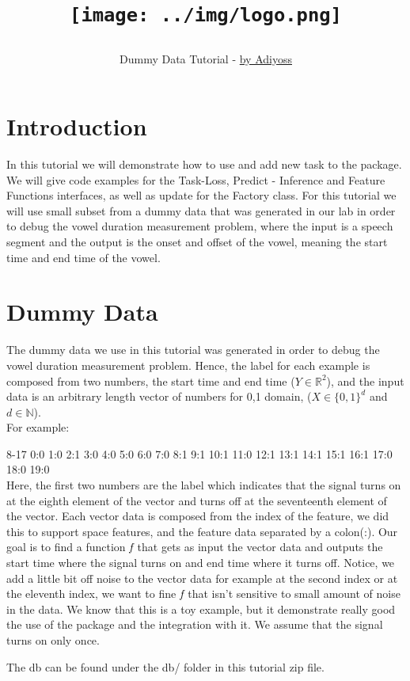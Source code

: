 \documentclass[11pt, oneside]{article}   	%
\title{\centerline{\texttt{[image: ../img/logo.png]}}}
\author{Dummy Data Tutorial - \href{http://adiyoss.github.io/}{by Adiyoss}}
\begin{document}
\maketitle
\section{Introduction}
In this tutorial we will demonstrate how to use and add new task to the \stred package. We will give code examples for the Task-Loss, Predict - Inference and Feature Functions interfaces, as well as update for the Factory class. For this tutorial we will use small subset from a dummy data that was generated in our lab in order to debug the vowel duration measurement problem, where the input is a speech segment and the output is the onset and offset of the vowel, meaning the start time and end time of the vowel.
\section{Dummy Data}
The dummy data we use in this tutorial was generated in order to debug the vowel duration measurement problem. Hence, the label for each example is composed from two numbers, the start time and end time ($Y\in{\mathbb{R}}^2$), and the input data is an arbitrary length vector of numbers for 0,1 domain, ($X \in{\{0,1\}}^d$ and $d\in{\mathbb{N}}$). \\
For example: 

8-17 0:0 1:0 2:1 3:0 4:0 5:0 6:0 7:0 8:1 9:1 10:1 11:0 12:1 13:1 14:1 15:1 16:1 17:0 18:0 19:0\\
Here, the first two numbers are the label which indicates that the signal turns on at the eighth element of the vector and turns off at the seventeenth element of the vector. Each vector data is composed from the index of the feature, we did this to support space features, and the feature data separated by a colon(:). Our goal is to find a function $\emph{f}$ that gets as input the vector data and outputs the start time where the signal turns on and end time where it turns off. Notice, we add a little bit off noise to the vector data for example at the second index or at the eleventh index, we want to fine $\emph{f}$ that isn't sensitive to small amount of noise in the data. We know that this is a toy example, but it demonstrate really good the use of the package and the integration with it. We assume that the signal turns on only once.

The db can be found under the db/ folder in this tutorial zip file.
\end{document}
